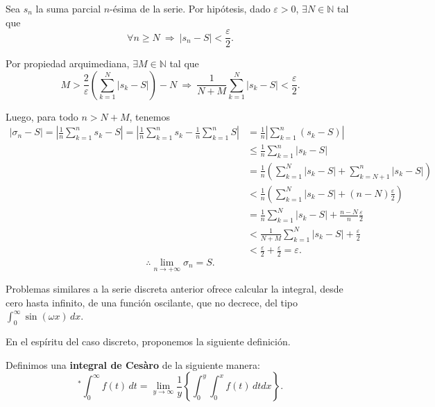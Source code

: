 \begin{demo}
Sea $s_n$ la suma parcial $n$-ésima de la serie. Por hipótesis, dado $\varepsilon > 0$, $\exists N \in \mathbb{N}$ tal que 
$$\forall n \geq N ~\Rightarrow~ |s_n -S| < \frac{\varepsilon}{2}.$$

Por propiedad arquimediana, $\exists M \in \mathbb{N}$ tal que 
$$M > \frac{2}{\varepsilon} \left( \sum_{k = 1}^N |s_k - S| \right )- N ~\Rightarrow~ \frac{1}{N+M} \sum_{k = 1}^N |s_k - S| <  \frac{\varepsilon}{2}.$$

Luego, para todo $n > N + M$, tenemos 
\begin{align*}
    |\sigma_n - S| = \left| \frac{1}{n} \sum_{k=1}^n s_k - S \right| = \left| \frac{1}{n} \sum_{k=1}^n s_k - \frac{1}{n} \sum_{k=1}^n S \right| 
    &= \frac{1}{n} \left|  \sum_{k=1}^n (s_k - S) \right| \\
    &\leq \frac{1}{n} \sum_{k=1}^n |s_k - S| \\
    &= \frac{1}{n} \left( \sum_{k=1}^N |s_k - S| + \sum_{k = N+1}^n |s_k - S| \right) \\
    &< \frac{1}{n}\left( \sum_{k=1}^N |s_k - S| + (n-N) \frac{\varepsilon}{2} \right) \\ 
    &=\frac{1}{n } \sum_{k=1}^N |s_k - S| + \frac{n-N}{n} \frac{\varepsilon}{2} \\
    &< \frac{1}{N+M} \sum_{k=1}^N |s_k - S| + \frac{\varepsilon}{2} \\
    &< \frac{\varepsilon}{2} + \frac{\varepsilon}{2} = \varepsilon. 
\end{align*}
$$\therefore \lim_{n \to + \infty} \sigma_n = S.$$
\end{demo}

Problemas similares a la serie discreta anterior ofrece calcular la integral, desde cero hasta infinito, de una función oscilante, que no decrece, del tipo $\int_0^{\infty} \sin(\omega x) \,dx$.

En el espíritu del caso discreto, proponemos la siguiente definición.

\begin{defi}
Definimos una \textbf{integral de Cesàro} de la siguiente manera:
\begin{equation}
    ^* \int_0^{\infty} f(t) \,dt = \lim_{y \to \infty } \frac{1}{y} \left\{ \int_0^y \int_0^x f(t) \,dt dx \right\}. \label{IntegralCesaro1}
\end{equation}

\end{defi}



